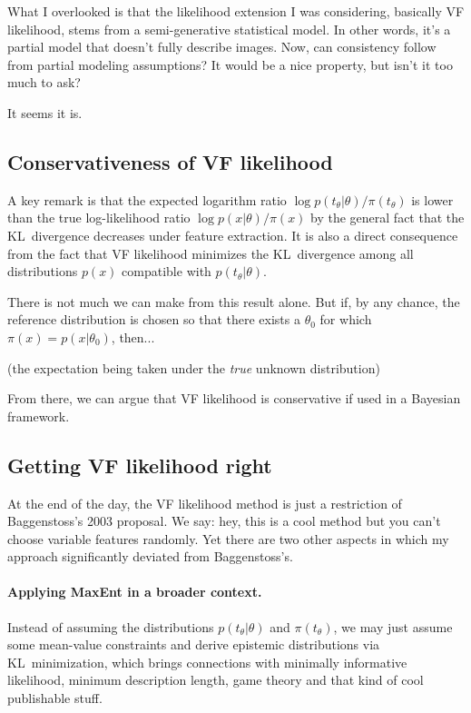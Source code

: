 \documentclass[english]{scrartcl}
\begin{document}
What I overlooked is that the likelihood extension I was considering, basically VF likelihood, stems from a semi-generative statistical model. In other words, it's a partial model that doesn't fully describe images. Now, can consistency follow from partial modeling assumptions? It would be a nice property, but isn't it too much to ask?

It seems it is.

\subsection{Conservativeness of VF likelihood}

A key remark is that the expected logarithm ratio $\log p(t_\theta|\theta)/\pi(t_\theta)$ is lower than the true log-likelihood ratio $\log p(x|\theta)/\pi(x)$ by the general fact that the KL~divergence decreases under feature extraction. It is also a direct consequence from the fact that VF likelihood minimizes the KL~divergence among all distributions $p(x)$ compatible with $p(t_\theta|\theta)$. 

There is not much we can make from this result alone. But if, by any chance, the reference distribution is chosen so that there exists a $\theta_0$ for which $\pi(x)=p(x|\theta_0)$, then...

(the expectation being taken under the {\em true} unknown distribution)


From there, we can argue that VF likelihood is conservative if used in a Bayesian framework.

\subsection{Getting VF likelihood right}

At the end of the day, the VF likelihood method is just a restriction of Baggenstoss's 2003 proposal. We say: hey, this is a cool method but you can't choose variable features randomly. Yet there are two other aspects in which my approach significantly deviated from Baggenstoss's.

\paragraph{Applying MaxEnt in a broader context.} Instead of assuming the distributions $p(t_\theta|\theta)$ and $\pi(t_\theta)$, we may just assume some mean-value constraints and derive epistemic distributions via KL~minimization, which brings connections with minimally informative likelihood, minimum description length, game theory and that kind of cool publishable stuff.
\end{document}
